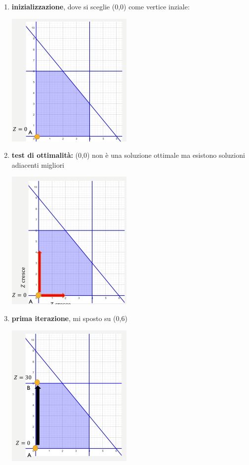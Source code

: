 \documentclass[a4paper,12pt, oneside]{book}
\begin{document}
\begin{enumerate}
  \item \textbf{inizializzazione}, dove si sceglie (0,0) come vertice
  inziale:
  \begin{center}
    \includegraphics[scale = 0.8]{img/simp8.png}
  \end{center}
  \item \textbf{test di ottimalità:} (0,0) non è una soluzione
  ottimale ma esistono soluzioni adiacenti migliori
  \begin{center}
    \includegraphics[scale = 0.8]{img/simp9.png}
  \end{center}
  \item \textbf{prima iterazione}, mi sposto su (0,6)
  \begin{center}
    \includegraphics[scale = 0.8]{img/simp10.png}

\end{center}
\end{enumerate}
\end{document}
